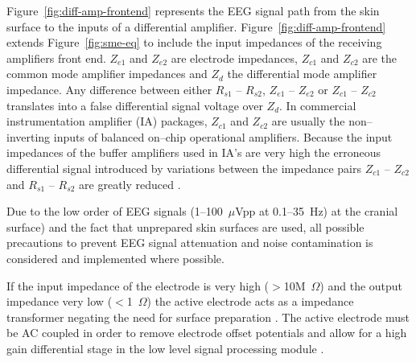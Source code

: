Figure~\vref{fig:diff-amp-frontend} represents the EEG signal path
from the skin surface to the inputs of a differential
amplifier. Figure~\vref{fig:diff-amp-frontend} extends
Figure~\vref{fig:sme-eq} to include the input impedances of the
receiving amplifiers front end. $Z_{e1}$ and $Z_{e2}$ are electrode
impedances, $Z_{c1}$ and $Z_{c2}$ are the common mode amplifier
impedances and $Z_d$ the differential mode amplifier impedance. Any
difference between either $R_{s1}$ -- $R_{s2}$, $Z_{e1}$ -- $Z_{e2}$
or $Z_{c1}$ -- $Z_{c2}$ translates into a false differential signal
voltage over $Z_d$. In commercial instrumentation amplifier (IA)
packages, $Z_{c1}$ and $Z_{c2}$ are usually the non--inverting inputs
of balanced on--chip operational amplifiers. Because the input
impedances of the buffer amplifiers used in IA's are very high the
erroneous differential signal introduced by variations between the
impedance pairs $Z_{c1}$ -- $Z_{c2}$ and $R_{s1}$ -- $R_{s2}$ are
greatly reduced \cite{buffer}.

Due to the low order of EEG signals (1--100~$\mu$Vpp at 0.1--35~Hz)
at the cranial surface) \cite{intro-to-bio} and the fact that
unprepared skin surfaces are used, all possible precautions to prevent
EEG signal attenuation and noise contamination is considered and
implemented where possible.

If the input impedance of the electrode is very high ($>$10M~$\Omega$)
and the output impedance very low ($<$1~$\Omega$) the active electrode
acts as a impedance transformer negating the need for surface
preparation \cite{active-electrode-ca}. The active electrode must be
AC coupled in order to remove electrode offset potentials and allow for
a high gain differential stage in the low level signal processing
module \cite{buffer}.

